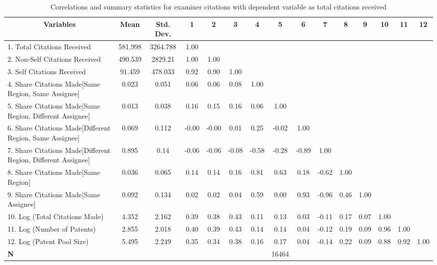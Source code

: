 \begin{sidewaystable}[htbp] \centering \caption{Correlations and summary statistics for examiner citations with dependent variable as total citations received \label{e.tcorrelation}}
\scriptsize
\onehalfspacing
\begin{tabular}{l  c  c  c  c  c  c  c  c  c  c  c  c  c  c }\hline\hline
\multicolumn{1}{c}{Variables} & \textbf{Mean}& \textbf{Std. Dev.}&1&2&3&4&5&6&7&8&9&10&11&12\\ \hline 
1. Total Citations Received& 581.998 & 3264.788&1.00\\
2. Non-Self Citations Received& 490.539 & 2829.21&1.00&1.00\\
3. Self Citations Received& 91.459 & 478.033&0.92&0.90&1.00\\
4. Share Citations Made[Same Region, Same Assignee]& 0.023 & 0.051&0.06&0.06&0.08&1.00\\
5. Share Citations Made[Same Region, Different Assignee]& 0.013 & 0.038&0.16&0.15&0.16&0.06&1.00\\
6. Share Citations Made[Different Region, Same Assignee] & 0.069 & 0.112&-0.00&-0.00&0.01&0.25&-0.02&1.00\\
7. Share Citations Made[Different Region, Different Assignee]& 0.895 & 0.14&-0.06&-0.06&-0.08&-0.58&-0.28&-0.89&1.00\\
8. Share Citations Made[Same Region]& 0.036 & 0.065&0.14&0.14&0.16&0.81&0.63&0.18&-0.62&1.00\\
9. Share Citations Made[Same Assignee]& 0.092 & 0.134&0.02&0.02&0.04&0.59&0.00&0.93&-0.96&0.46&1.00\\
10. Log (Total Citations Made)& 4.352 & 2.162&0.39&0.38&0.43&0.11&0.13&0.03&-0.11&0.17&0.07&1.00\\
11. Log (Number of Patents)& 2.855 & 2.018&0.40&0.39&0.43&0.14&0.14&0.04&-0.12&0.19&0.09&0.96&1.00\\
12. Log (Patent Pool Size)& 5.495 & 2.249&0.35&0.34&0.38&0.16&0.17&0.04&-0.14&0.22&0.09&0.88&0.92&1.00\\
\hline
\textbf{N}&&&&&&&16464\\
\hline \hline 
 \end{tabular}
\end{sidewaystable}
